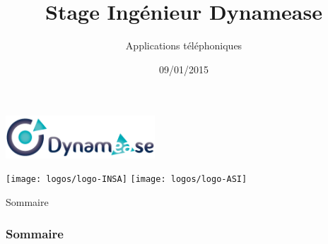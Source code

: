\documentclass[9pt,xcolor=table]{beamer}
\title{Stage Ingénieur Dynamease}
\subtitle{Applications téléphoniques}
\date{09/01/2015}
\begin{document}
	\begin{frame}
		\titlepage
		\begin{center}
			\includegraphics[height=16mm]{images/logo-dynamease}
		\end{center}
		\vspace{7mm}
		\texttt{[image: logos/logo-INSA]}
		\hspace{2mm}
		\texttt{[image: logos/logo-ASI]}
	\end{frame}


	\begin{frame}{Sommaire}
		\frametitle{Sommaire}
		 \small \tableofcontents
	\end{frame}
    
    
	 
	 
	 
	 
	 
\end{document}
